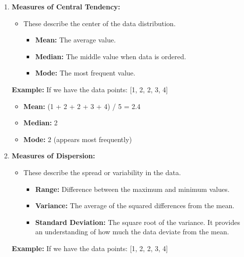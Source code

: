 \documentclass[12pt]{book}
\providecommand{\tightlist}{%
  \setlength{\itemsep}{0pt}\setlength{\parskip}{0pt}}
\begin{document}
\begin{enumerate}
\def\labelenumi{\arabic{enumi}.}
\tightlist
\item
  \textbf{Measures of Central Tendency:}

  \begin{itemize}
  \tightlist
  \item
    These describe the center of the data distribution.

    \begin{itemize}
    \tightlist
    \item
      \textbf{Mean:} The average value.
    \item
      \textbf{Median:} The middle value when data is ordered.
    \item
      \textbf{Mode:} The most frequent value.
    \end{itemize}
  \end{itemize}

  \textbf{Example:} If we have the data points: {[}1, 2, 2, 3, 4{]}

  \begin{itemize}
  \tightlist
  \item
    \textbf{Mean:} (1 + 2 + 2 + 3 + 4) / 5 = 2.4
  \item
    \textbf{Median:} 2
  \item
    \textbf{Mode:} 2 (appears most frequently)
  \end{itemize}
\item
  \textbf{Measures of Dispersion:}

  \begin{itemize}
  \tightlist
  \item
    These describe the spread or variability in the data.

    \begin{itemize}
    \tightlist
    \item
      \textbf{Range:} Difference between the maximum and minimum values.
    \item
      \textbf{Variance:} The average of the squared differences from the
      mean.
    \item
      \textbf{Standard Deviation:} The square root of the variance. It
      provides an understanding of how much the data deviate from the
      mean.
    \end{itemize}
  \end{itemize}

  \textbf{Example:} If we have the data points: {[}1, 2, 2, 3, 4{]}


\end{enumerate}
\end{document}

